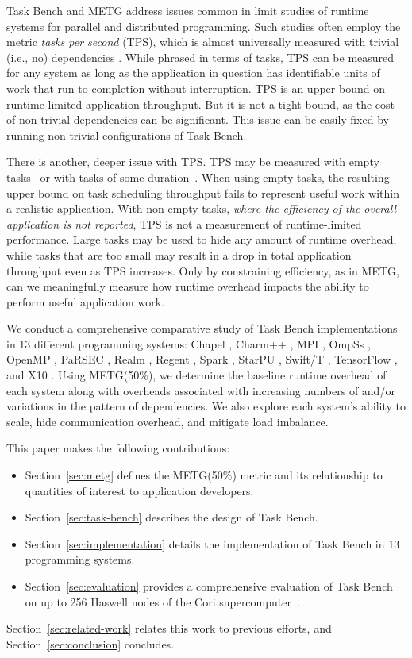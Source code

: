 Task Bench and METG address issues common in limit studies of runtime
systems for parallel and distributed programming. Such studies often
employ the metric \emph{tasks per second} (TPS), which is almost
universally measured with trivial (i.e., no) dependencies \cite{LegionTracing18, Canary16, Armstrong14}. While
phrased in terms of tasks, TPS can be measured for any system as long
as the application in question has identifiable units of work that run
to completion without interruption. TPS is an upper bound on
runtime-limited application throughput. But it is not a tight bound, as the
cost of non-trivial dependencies can be significant. This issue can be easily fixed by running non-trivial
configurations of Task Bench.

There is another, deeper issue with TPS. TPS may be measured with
empty tasks~\cite{LegionTracing18} or with tasks of some
duration~\cite{Canary16, Armstrong14}. When using empty tasks, the
resulting upper bound on task scheduling throughput fails to represent
useful work within a realistic application. With non-empty tasks,
\emph{where the efficiency of the overall application is not
 reported}, TPS is not a measurement of runtime-limited
performance. Large tasks may be used to hide any amount of runtime
overhead, while tasks that are too small may result in a drop in total
application throughput even as TPS increases. Only by constraining
efficiency, as in METG, can we meaningfully measure how runtime
overhead impacts the ability to perform useful application work.

We conduct a comprehensive comparative study of Task Bench
implementations in 13 different programming systems:
Chapel \cite{Chapel15}, Charm++ \cite{Charmpp93}, MPI \cite{MPI},
OmpSs \cite{OmpSs11}, OpenMP \cite{OpenMPSpec40},
PaRSEC \cite{PARSEC13}, Realm \cite{Realm14}, Regent \cite{Regent15},
Spark \cite{Spark10}, StarPU \cite{StarPU11},
Swift/T \cite{Wozniak13}, TensorFlow \cite{TensorFlow15}, and
X10 \cite{X1005}. Using METG(50\%), we determine the baseline
runtime overhead of each system along with overheads associated with
increasing numbers of and/or variations in the pattern of dependencies. We
also explore each system's ability to scale, hide communication
overhead, and mitigate load imbalance.

This paper makes the following contributions:


\begin{itemize}
\item Section~\ref{sec:metg} defines the METG(50\%) metric and its
  relationship to quantities of interest to application developers.
\item Section~\ref{sec:task-bench} describes the design of Task Bench.
\item Section~\ref{sec:implementation} details the implementation of
  Task Bench in 13 programming systems.
\item Section~\ref{sec:evaluation} provides a comprehensive evaluation
  of Task Bench on up to 256 Haswell nodes of the Cori
  supercomputer~\cite{Cori}.
\end{itemize}

Section~\ref{sec:related-work} relates this work to previous efforts,
and Section~\ref{sec:conclusion} concludes.
